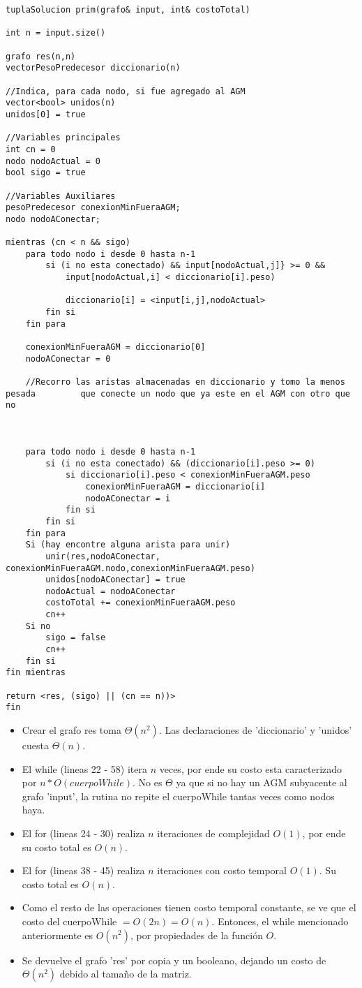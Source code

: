 \begin{lstlisting}
tuplaSolucion prim(grafo& input, int& costoTotal)

int n = input.size()

grafo res(n,n)
vectorPesoPredecesor diccionario(n)

//Indica, para cada nodo, si fue agregado al AGM
vector<bool> unidos(n)
unidos[0] = true

//Variables principales
int cn = 0
nodo nodoActual = 0
bool sigo = true

//Variables Auxiliares
pesoPredecesor conexionMinFueraAGM;
nodo nodoAConectar;

mientras (cn < n && sigo)
	para todo nodo i desde 0 hasta n-1
		si (i no esta conectado) && input[nodoActual,j]} >= 0 &&
		    input[nodoActual,i] < diccionario[i].peso)
		    
			diccionario[i] = <input[i,j],nodoActual>
		fin si
	fin para

	conexionMinFueraAGM = diccionario[0]
	nodoAConectar = 0

	//Recorro las aristas almacenadas en diccionario y tomo la menos pesada 		que conecte un nodo que ya este en el AGM con otro que no



	para todo nodo i desde 0 hasta n-1
		si (i no esta conectado) && (diccionario[i].peso >= 0)
			si diccionario[i].peso < conexionMinFueraAGM.peso
				conexionMinFueraAGM = diccionario[i]
				nodoAConectar = i
			fin si
		fin si
	fin para
	Si (hay encontre alguna arista para unir)
		unir(res,nodoAConectar, conexionMinFueraAGM.nodo,conexionMinFueraAGM.peso)
		unidos[nodoAConectar] = true
		nodoActual = nodoAConectar
		costoTotal += conexionMinFueraAGM.peso
		cn++
	Si no
		sigo = false
		cn++
	fin si
fin mientras

return <res, (sigo) || (cn == n))>
fin
\end{lstlisting}


\begin{itemize}
\item Crear el grafo res toma $\Theta(n^2)$. Las declaraciones de 'diccionario' y 'unidos' cuesta $\Theta(n)$.
\item El while (lineas 22 - 58) itera $n$ veces, por ende su costo esta caracterizado por $n*O(cuerpoWhile)$. No es $\Theta$ ya que si no hay un AGM subyacente al grafo 'input', la rutina no repite el cuerpoWhile tantas veces como nodos haya.
\item El for (lineas 24 - 30) realiza $n$ iteraciones de complejidad $O(1)$, por ende su costo total es $O(n)$.
\item El for (lineas 38 - 45) realiza $n$ iteraciones con costo temporal $O(1)$. Su costo total es $O(n)$.
\item Como el resto de las operaciones tienen costo temporal constante, se ve que el costo del cuerpoWhile $= O(2n) = O(n)$. Entonces, el while mencionado anteriormente es $O(n^2)$, por propiedades de la función $O$.
\item Se devuelve el grafo 'res' por copia y un booleano, dejando un costo de $\Theta(n^2)$ debido al tamaño de la matriz.
\end{itemize}

